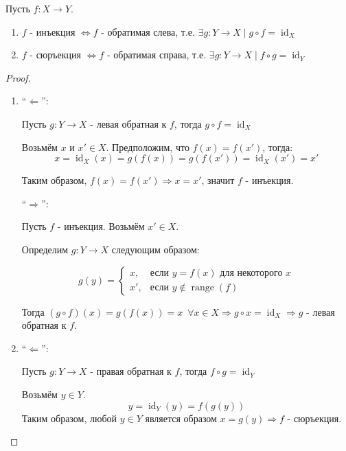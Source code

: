 $ $\\
\begin{theorem-non}
    Пусть $f: X \rightarrow Y$.
    \begin{enumerate}
        \item $f$ - инъекция $\Leftrightarrow f$ - обратимая слева, т.е.
        $\exists g : Y \rightarrow X \mid g \circ f = \operatorname{id}_X$
        \item $f$ - сюръекция $\Leftrightarrow f$ - обратимая справа, т.е.
        $\exists g : Y \rightarrow X \mid f \circ g = \operatorname{id}_Y$
    \end{enumerate}
\end{theorem-non}
\begin{proof} $ $
\begin{enumerate}
    \item 
    ``$\Longleftarrow$'':
    
    Пусть $g : Y \rightarrow X$ - левая обратная к $f$,
    тогда $g \circ f = \operatorname{id}_X$
    
    Возьмём $x$ и $x' \in X$. Предположим, что $f(x) = f(x')$,
    тогда:
    \[ x = \operatorname{id}_X(x) = g(f(x)) = g(f(x')) = 
    \operatorname{id}_X(x') = x' \]
    
    Таким образом, $f(x) = f(x') \Rightarrow x = x'$, 
    значит $f$ - инъекция.
    
    ``$\Longrightarrow$'':
    
    Пусть $f$ - инъекция. Возьмём $x' \in X$.
    
    Определим $g : Y \rightarrow X$ следующим образом:
    
    \[ g(y) = \begin{cases}
        x, & \mbox{если } y = f(x) \mbox{ для некоторого } x \\
        x', & \mbox{если } y \notin \operatorname{range}(f) 
    \end{cases} \]
    
    Тогда $(g \circ f)(x) = g(f(x)) = x \,\,\, \forall x \in X
    \Rightarrow g \circ x = \operatorname{id}_X \Rightarrow g$ - 
    левая обратная к $f$.
    
    \item 
    ``$\Longleftarrow$'':
    
    Пусть $g : Y \rightarrow X$ - правая обратная к $f$,
    тогда $f \circ g = \operatorname{id}_Y$
    
    Возьмём $y \in Y$.
    \[ y = \operatorname{id}_Y(y) = f(g(y)) \]
    Таким образом, любой $y \in Y$ является образом $x = g(y)
    \Rightarrow f$ - сюръекция.
    

\end{enumerate}
\end{proof}
